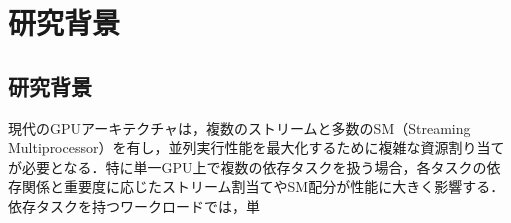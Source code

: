 \section{研究背景}\subsection{研究背景}現代のGPUアーキテクチャは，複数のストリームと多数のSM（Streaming Multiprocessor）を有し，並列実行性能を最大化するために複雑な資源割り当てが必要となる．特に単一GPU上で複数の依存タスクを扱う場合，各タスクの依存関係と重要度に応じたストリーム割当てやSM配分が性能に大きく影響する．依存タスクを持つワークロードでは，単